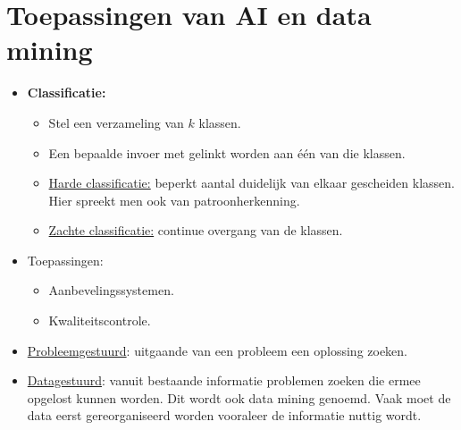\section{Toepassingen van AI en data mining}
\begin{itemize}
	\item \textbf{Classificatie:} 
	\begin{itemize}
		\item Stel een verzameling van $k$ klassen.
		\item Een bepaalde invoer met gelinkt worden aan één van die klassen.
		\item \uline{Harde classificatie:} beperkt aantal duidelijk van elkaar gescheiden klassen. Hier spreekt men ook van patroonherkenning.
		\item \uline{Zachte classificatie:} continue overgang van de klassen. 
	\end{itemize}
	\item Toepassingen:
	\begin{itemize}
		\item Aanbevelingssystemen.
		\item Kwaliteitscontrole.
	\end{itemize}
	\item \uline{Probleemgestuurd}: uitgaande van een probleem een oplossing zoeken.
	\item \uline{Datagestuurd}: vanuit bestaande informatie problemen zoeken die ermee opgelost kunnen worden. Dit wordt ook data mining genoemd. Vaak moet de data eerst gereorganiseerd worden vooraleer de informatie nuttig wordt.
\end{itemize}
